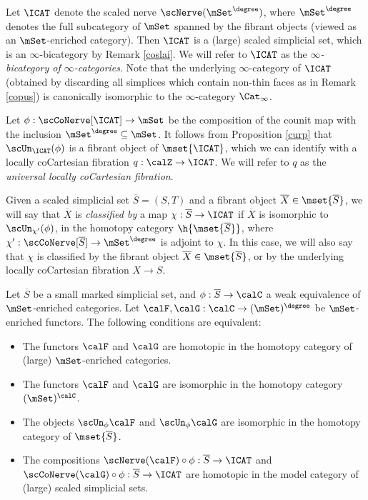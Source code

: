 \begin{definition}\label{scorpus}
Let $\ICAT$ denote the scaled nerve $\scNerve( \mSet^{\degree})$, where
$\mSet^{\degree}$ denotes the full subcategory of $\mSet$ spanned by the fibrant objects
(viewed as an $\mSet$-enriched category). Then $\ICAT$ is a (large) scaled simplicial set, which is an $\infty$-bicategory by Remark \ref{coslai}. We will refer to $\ICAT$ as the
{\it $\infty$-bicategory of $\infty$-categories}. Note that the underlying $\infty$-category
of $\ICAT$ (obtained by discarding all simplices which contain non-thin faces as in Remark \ref{copus}) is canonically isomorphic to the $\infty$-category $\Cat_{\infty}$.

Let $\phi: \scCoNerve[ \ICAT ] \rightarrow \mSet$ be the composition of the counit map
with the inclusion $\mSet^{\degree} \subseteq \mSet$. It follows from Proposition \ref{curp} that
$\scUn_{ \ICAT}(\phi)$ is a fibrant object of $\mset{ \ICAT}$, which we can identify with a locally coCartesian fibration $q: \calZ \rightarrow \ICAT$. We will refer to $q$ as the {\em universal locally coCartesian fibration}.

Given a scaled simplicial set $\overline{S}= (S,T)$ and a fibrant object $\overline{X} \in \mset{ \overline{S}}$, we will say that $\overline{X}$ is {\it classified by} a map $\chi: \overline{S} \rightarrow \ICAT$
if $\overline{X}$ is isomorphic to $\scUn_{ \chi'}(\phi)$, in the homotopy category
$\h{\mset{\overline{S}}}$, where $\chi': \scCoNerve[ \overline{S}] \rightarrow \mSet^{\degree}$ is adjoint to $\chi$. In this case, we will also say that $\chi$ is classified by the fibrant object
$\overline{X} \in \mset{ \overline{S} }$, or by the underlying locally coCartesian fibration
$X \rightarrow S$.
\end{definition}

\begin{proposition}\label{urple}
Let $\overline{S}$ be a small marked simplicial set, and $\phi: \overline{S} \rightarrow \calC$ a weak equivalence of $\mSet$-enriched categories. Let $\calF, \calG: \calC \rightarrow (\mSet)^{\degree}$ be 
$\mSet$-enriched functors. The following conditions are equivalent:
\begin{itemize}
\item[$(1)$] The functors $\calF$ and $\calG$ are homotopic in the homotopy category of
(large) $\mSet$-enriched categories.
\item[$(2)$] The functors $\calF$ and $\calG$ are isomorphic in the homotopy category
$(\mSet)^{\calC}$.
\item[$(3)$] The objects $\scUn_{\phi} \calF$ and $\scUn_{\phi} \calG$ are isomorphic in the homotopy category of $\mset{ \overline{S} }$.
\item[$(4)$] The compositions $\scNerve(\calF) \circ \phi: \overline{S} \rightarrow \ICAT$
and $\scCoNerve(\calG) \circ \phi: \overline{S} \rightarrow \ICAT$ are homotopic 
in the model category of (large) scaled simplicial sets.
\end{itemize}
\end{proposition}

